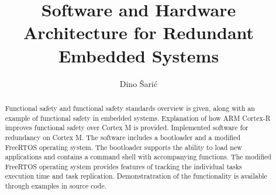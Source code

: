 \documentclass[utf8, diplomski, english, numeric]{fer}
\begin{document}

\title{Software and Hardware Architecture for Redundant Embedded Systems}

\author{Dino Šarić}

\maketitle

\izvornik


\tableofcontents
\listoffigures

\listoftodos













\begin{abstract}

Functional safety and functional safety standards overview is given, along with an example of functional safety in embedded systems. Explanation of how ARM Cortex-R improves functional safety over Cortex M is provided. Implemented software for redundancy on Cortex M. The software includes a bootloader and a modified FreeRTOS operating system. The bootloader supports the ability to load new applications and contains a command shell with accompanying functions. The modified FreeRTOS operating system provides features of tracking the individual tasks execution time and task replication. Demonstratration of the functionality is available through examples in source code.

\end{abstract}
\end{document}
